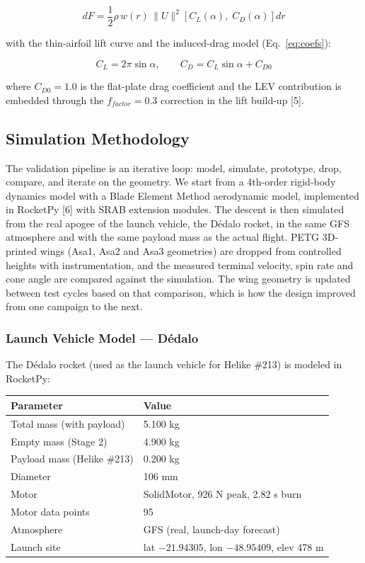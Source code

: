 \begin{equation}
dF = \frac{1}{2}\rho\, w(r)\, \|U\|^2 \left[C_L(\alpha),\; C_D(\alpha)\right] dr
\label{eq:bem}
\end{equation}

with the thin-airfoil lift curve and the induced-drag model
(Eq.~\ref{eq:coefs}):

\begin{equation}
C_L = 2\pi\sin\alpha, \qquad
C_D = C_L \sin\alpha + C_{D0}
\label{eq:coefs}
\end{equation}

where $C_{D0} = 1.0$ is the flat-plate drag coefficient and the LEV
contribution is embedded through the $f_{factor} = 0.3$ correction in
the lift build-up [5].

\subsection{Simulation Methodology}

The validation pipeline is an iterative loop: model, simulate,
prototype, drop, compare, and iterate on the geometry. We start from a
4th-order rigid-body dynamics model with a Blade Element Method
aerodynamic model, implemented in RocketPy [6] with SRAB extension
modules. The descent is then simulated from the real apogee of the
launch vehicle, the Dédalo rocket, in the same GFS atmosphere and with
the same payload mass as the actual flight. PETG 3D-printed wings
(Asa1, Asa2 and Asa3 geometries) are dropped from controlled heights
with instrumentation, and the measured terminal velocity, spin rate
and cone angle are compared against the simulation. The wing geometry
is updated between test cycles based on that comparison, which is how
the design improved from one campaign to the next.

\subsubsection{Launch Vehicle Model — Dédalo}

The Dédalo rocket (used as the launch vehicle for Helike \#213) is
modeled in RocketPy:

\begin{center}
{\small
\setlength{\tabcolsep}{6pt}
\begin{tabular}{>{\raggedright}p{5.2cm}l}
\toprule
\textbf{Parameter} & \textbf{Value} \\
\midrule
Total mass (with payload) & 5.100 kg \\
Empty mass (Stage 2) & 4.900 kg \\
Payload mass (Helike \#213) & 0.200 kg \\
Diameter & 106 mm \\
Motor & SolidMotor, 926 N peak, 2.82 s burn \\
Motor data points & 95 \\
Atmosphere & GFS (real, launch-day forecast) \\
Launch site & lat $-21.94305$, lon $-48.95409$, elev 478 m \\
\bottomrule
\end{tabular}
}
\end{center}


